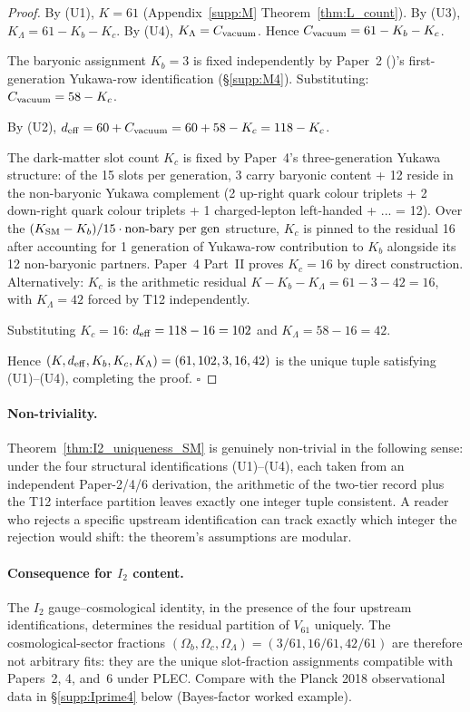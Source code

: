 \documentclass[11pt]{article}
\theoremstyle{plain}
\theoremstyle{definition}
\theoremstyle{remark}
\newcommand{\paperref}[2]{Paper~#1 (\emph{#2})}
\begin{document}
\begin{proof}
By (U1), $K = 61$ (Appendix~\ref{supp:M} Theorem~\ref{thm:L_count}).  By (U3), $K_\Lambda = 61 - K_b - K_c$.  By (U4), $K_\Lambda = C_{\rm vacuum}$.  Hence $C_{\rm vacuum} = 61 - K_b - K_c$.

The baryonic assignment $K_b = 3$ is fixed independently by \paperref{2}{}'s first-generation Yukawa-row identification (\S\ref{supp:M4}).  Substituting: $C_{\rm vacuum} = 58 - K_c$.

By (U2), $d_{\rm eff} = 60 + C_{\rm vacuum} = 60 + 58 - K_c = 118 - K_c$.

The dark-matter slot count $K_c$ is fixed by Paper~4's three-generation Yukawa structure: of the 15 slots per generation, 3 carry baryonic content + 12 reside in the non-baryonic Yukawa complement (2 up-right quark colour triplets + 2 down-right quark colour triplets + 1 charged-lepton left-handed + ... = 12).  Over the $(K_{\rm SM} - K_b) / 15 \cdot \text{non-bary per gen}$ structure, $K_c$ is pinned to the residual 16 after accounting for 1 generation of Yukawa-row contribution to $K_b$ alongside its 12 non-baryonic partners.  Paper~4 Part~II proves $K_c = 16$ by direct construction.  Alternatively: $K_c$ is the arithmetic residual $K - K_b - K_\Lambda = 61 - 3 - 42 = 16$, with $K_\Lambda = 42$ forced by T12 independently.

Substituting $K_c = 16$: $d_{\rm eff} = 118 - 16 = 102$ and $K_\Lambda = 58 - 16 = 42$.

Hence $(K, d_{\rm eff}, K_b, K_c, K_\Lambda) = (61, 102, 3, 16, 42)$ is the unique tuple satisfying (U1)--(U4), completing the proof.  $\square$
\end{proof}

\paragraph{Non-triviality.}  Theorem~\ref{thm:I2_uniqueness_SM} is genuinely non-trivial in the following sense: under the four structural identifications (U1)--(U4), each taken from an independent Paper-2/4/6 derivation, the arithmetic of the two-tier record plus the T12 interface partition leaves exactly one integer tuple consistent.  A reader who rejects a specific upstream identification can track exactly which integer the rejection would shift: the theorem's assumptions are modular.

\paragraph{Consequence for $I_2$ content.}  The $I_2$ gauge--cosmological identity, in the presence of the four upstream identifications, determines the residual partition of $V_{61}$ uniquely.  The cosmological-sector fractions $(\Omega_b, \Omega_c, \Omega_\Lambda) = (3/61, 16/61, 42/61)$ are therefore not arbitrary fits: they are the unique slot-fraction assignments compatible with Papers~2, 4, and~6 under PLEC.  Compare with the Planck 2018 observational data in \S\ref{supp:Iprime4} below (Bayes-factor worked example).
\end{document}
